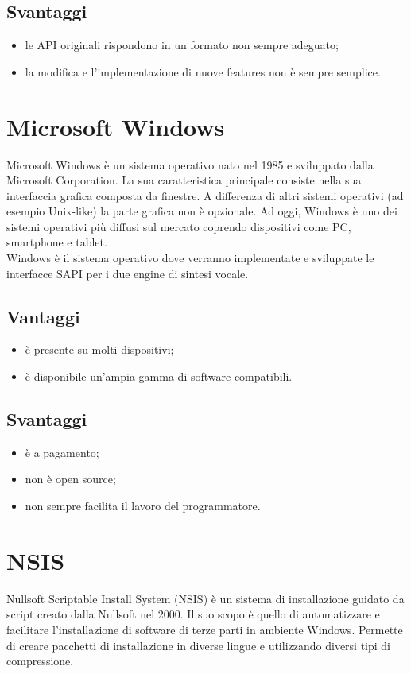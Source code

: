 \subsection*{Svantaggi}
\begin{itemize}
	\item le API originali rispondono in un formato non sempre adeguato;
	\item la modifica e l'implementazione di nuove features non è sempre semplice.
\end{itemize}
\section{Microsoft Windows}
Microsoft Windows è un sistema operativo nato nel 1985 e sviluppato dalla Microsoft Corporation. La sua caratteristica principale consiste nella sua interfaccia grafica composta da finestre. A differenza di altri sistemi operativi (ad esempio Unix-like) la parte grafica non è opzionale. Ad oggi, Windows è uno dei sistemi operativi più diffusi sul mercato coprendo dispositivi come PC, smartphone e tablet.\\
Windows è il sistema operativo dove verranno implementate e sviluppate le interfacce SAPI per i due engine di sintesi vocale.
\subsection*{Vantaggi}
\begin{itemize}
	\item è presente su molti dispositivi;
	\item è disponibile un'ampia gamma di software compatibili.
\end{itemize}
\subsection*{Svantaggi}
\begin{itemize}
	\item è a pagamento;
	\item non è open source;
	\item non sempre facilita il lavoro del programmatore.
\end{itemize}
\section{NSIS}
Nullsoft Scriptable Install System (NSIS) è un sistema di installazione guidato da script creato dalla Nullsoft nel 2000. Il suo scopo è quello di automatizzare e facilitare l'installazione di software di terze parti in ambiente Windows. Permette di creare pacchetti di installazione in diverse lingue e utilizzando diversi tipi di compressione.

